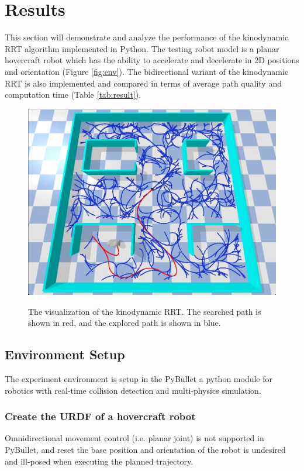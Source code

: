 \documentclass[11pt, conference]{IEEEtran}
\begin{document}
\section{Results}

This section will demonstrate and analyze the performance of the kinodynamic RRT algorithm implemented in Python. The testing robot model is a planar hovercraft robot which has the ability to accelerate and decelerate in 2D positions and orientation (Figure \ref{fig:env}). The bidirectional variant of the kinodynamic RRT is also implemented and compared in terms of average path quality and computation time (Table \ref{tab:result}).

\begin{figure}[htb]
    \centering
        \textsf{\includegraphics[width=0.9\columnwidth]{figures/KdRRT.png}}
        \caption{The visualization of the kinodynamic RRT. The searched path is shown in red, and the explored path is shown in blue.}
        \label{fig:kd-rrt}
\end{figure}

\subsection{Environment Setup}

The experiment environment is setup in the PyBullet\cite{coumans2016pybullet} a python module for robotics with real-time collision detection and multi-physics simulation\cite{coumans2015bullet}.

\subsubsection{Create the URDF of a hovercraft robot}
Omnidirectional movement control (i.e. planar joint) is not supported in PyBullet, and reset the base position and orientation of the robot is undesired and ill-posed when executing the planned trajectory.
\end{document}
